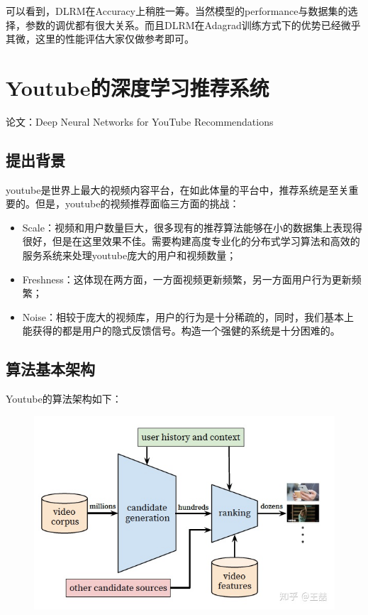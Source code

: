\documentclass[12pt]{article}
\begin{document}
可以看到，DLRM在Accuracy上稍胜一筹。当然模型的performance与数据集的选择，参数的调优都有很大关系。而且DLRM在Adagrad训练方式下的优势已经微乎其微，这里的性能评估大家仅做参考即可。

\section{Youtube的深度学习推荐系统}
论文：Deep Neural Networks for YouTube Recommendations

\subsection{提出背景\cite{Recommender_System_With_Deep_Learning_Youtube}}
youtube是世界上最大的视频内容平台，在如此体量的平台中，推荐系统是至关重要的。但是，youtube的视频推荐面临三方面的挑战：
\begin{itemize}
\setlength{\itemsep}{0pt}
\setlength{\parsep}{0pt}
\setlength{\parskip}{0pt}
    \item Scale：视频和用户数量巨大，很多现有的推荐算法能够在小的数据集上表现得很好，但是在这里效果不佳。需要构建高度专业化的分布式学习算法和高效的服务系统来处理youtube庞大的用户和视频数量；
    \item Freshness：这体现在两方面，一方面视频更新频繁，另一方面用户行为更新频繁；
    \item Noise：相较于庞大的视频库，用户的行为是十分稀疏的，同时，我们基本上能获得的都是用户的隐式反馈信号。构造一个强健的系统是十分困难的。
\end{itemize}



\subsection{算法基本架构}
Youtube的算法架构如下：
\begin{figure}[H]
    \centering
    \includegraphics[width=.6\textwidth]{fig/YouTube_Algorithm_Architect.jpg}
\end{figure}
\end{document}
